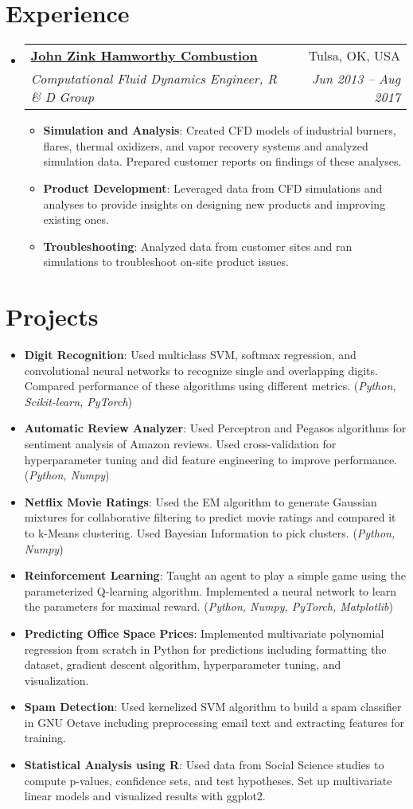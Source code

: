 \documentclass[letterpaper,11pt]{article}
\makeatletter
\newcommand{\resumeItem}[2]{
	\item\small{
		\textbf{#1}{: #2 \vspace{-2pt}}
	}
}
\newcommand{\resumeSubheading}[4]{
	\vspace{-1pt}\item
	\begin{tabular*}{0.97\textwidth}[t]{l@{\extracolsep{\fill}}r}
		\textbf{#1} & #2 \\
		\textit{\small#3} & \textit{\small #4} \\
	\end{tabular*}\vspace{-5pt}
}
\newcommand{\resumeSubItem}[2]{\resumeItem{#1}{#2}\vspace{-4pt}}
\newcommand{\resumeSubHeadingListStart}{\begin{itemize}[leftmargin=*]}
\newcommand{\resumeSubHeadingListEnd}{\end{itemize}}
\newcommand{\resumeItemListStart}{\begin{itemize}}
\newcommand{\resumeItemListEnd}{\end{itemize}\vspace{-5pt}}
\makeatother
\begin{document}
	\section{Experience}
	\resumeSubHeadingListStart
	
	\resumeSubheading
	{\href{https://www.johnzinkhamworthy.com/}{John Zink Hamworthy Combustion}}{Tulsa, OK, USA}
	{Computational Fluid Dynamics Engineer, R \& D Group}{Jun 2013 -- Aug 2017}
	\resumeItemListStart
	\resumeItem{Simulation and Analysis}
	{Created CFD models of industrial burners, flares, thermal oxidizers, and vapor recovery systems and analyzed simulation data. Prepared customer reports on findings of these analyses.}
	\resumeItem{Product Development}
	{Leveraged data from CFD simulations and analyses to provide insights on designing new products and improving existing ones.}
	\resumeItem{Troubleshooting}
	{Analyzed data from customer sites and ran simulations to troubleshoot on-site product issues.}
	\resumeItemListEnd
	\resumeSubHeadingListEnd
	
	\section{Projects}
	\resumeSubHeadingListStart
	\resumeSubItem{Digit Recognition}
	{Used multiclass SVM, softmax regression, and convolutional neural networks to recognize single and overlapping digits. Compared performance of these algorithms using different metrics. (\textit{\small Python, Scikit-learn, PyTorch})}
	\resumeSubItem{Automatic Review Analyzer}
	{Used Perceptron and Pegasos algorithms for sentiment analysis of Amazon reviews. Used cross-validation for hyperparameter tuning and did feature engineering to improve performance. (\textit{\small Python, Numpy})}
	\resumeSubItem{Netflix Movie Ratings}
	{Used the EM algorithm to generate Gaussian mixtures for collaborative filtering to predict movie ratings and compared it to k-Means clustering. Used Bayesian Information to pick clusters. (\textit{\small Python, Numpy})}
	\resumeSubItem{Reinforcement Learning}
	{Taught an agent to play a simple game using the parameterized Q-learning algorithm. Implemented a neural network to learn the parameters for maximal reward. (\textit{\small Python, Numpy, PyTorch, Matplotlib})}
	\resumeSubItem{Predicting Office Space Prices}
	{Implemented multivariate polynomial regression from scratch in Python for predictions including formatting the dataset, gradient descent algorithm, hyperparameter tuning, and visualization.}
	\resumeSubItem{Spam Detection}
	{Used kernelized SVM algorithm to build a spam classifier in GNU Octave including preprocessing email text and extracting features for training.}
	\resumeSubItem{Statistical Analysis using R}
	{Used data from Social Science studies to compute p-values, confidence sets, and test hypotheses. Set up multivariate linear models and visualized results with ggplot2.}
	\resumeSubHeadingListEnd
	
\end{document}
